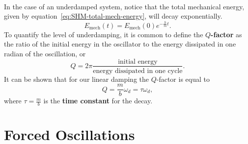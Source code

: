 \documentclass[../classical_mechanics.tex]{subfiles}
\begin{document}
        \paragraph{}
        In the case of an underdamped system, notice that the total mechanical energy, given by equation~\ref{eq:SHM-total-mech-energy}, will decay exponentially.
        \begin{equation}
            E_\text{mech}(t)=E_\text{mech}(0)e^{-\frac{b}{m}t}.
        \end{equation}
        To quantify the level of underdamping, it is common to define the \textbf{$Q$-factor} as the ratio of the initial energy in the oscillator to the energy dissipated in one radian of the oscillation, or
        \begin{equation}
            Q=2\pi\frac{\text{initial energy}}{\text{energy dissipated in one cycle}}.
        \end{equation}
        It can be shown that for our linear damping the $Q$-factor is equal to
        \begin{equation}
            Q=\frac{m}{b}\omega_d=\tau\omega_d,
        \end{equation}
        where $\tau=\frac{m}{b}$ is the \textbf{time constant} for the decay.


    \section{Forced Oscillations}
\end{document}
